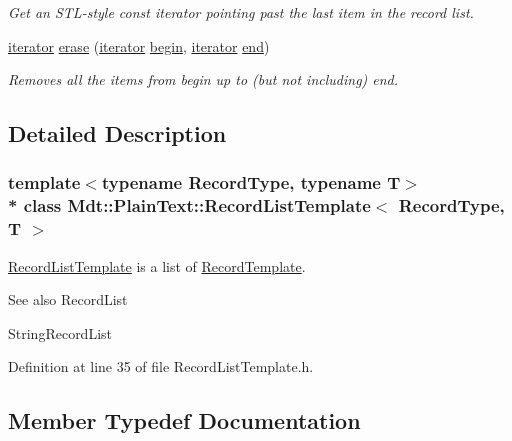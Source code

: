 \begin{DoxyCompactItemize}
\begin{DoxyCompactList}\small\item\em Get an S\+T\+L-\/style const iterator pointing past the last item in the record list. \end{DoxyCompactList}\item 
\hyperlink{class_mdt_1_1_plain_text_1_1_record_list_template_a5b0caae56b05a38e53539cad1da8cd12}{iterator} \hyperlink{class_mdt_1_1_plain_text_1_1_record_list_template_a0266fea4751369b369d81933043b87a9}{erase} (\hyperlink{class_mdt_1_1_plain_text_1_1_record_list_template_a5b0caae56b05a38e53539cad1da8cd12}{iterator} \hyperlink{class_mdt_1_1_plain_text_1_1_record_list_template_af4f42b3785c7ddbbafd9bf3c15ead7d4}{begin}, \hyperlink{class_mdt_1_1_plain_text_1_1_record_list_template_a5b0caae56b05a38e53539cad1da8cd12}{iterator} \hyperlink{class_mdt_1_1_plain_text_1_1_record_list_template_accf34cd248a894d4af04510312bbdf23}{end})
\begin{DoxyCompactList}\small\item\em Removes all the items from begin up to (but not including) end. \end{DoxyCompactList}\end{DoxyCompactItemize}


\subsection{Detailed Description}
\subsubsection*{template$<$typename Record\+Type, typename T$>$\\*
class Mdt\+::\+Plain\+Text\+::\+Record\+List\+Template$<$ Record\+Type, T $>$}

\hyperlink{class_mdt_1_1_plain_text_1_1_record_list_template}{Record\+List\+Template} is a list of \hyperlink{class_mdt_1_1_plain_text_1_1_record_template}{Record\+Template}. 

\begin{DoxySeeAlso}{See also}
Record\+List 

String\+Record\+List 
\end{DoxySeeAlso}


Definition at line 35 of file Record\+List\+Template.\+h.



\subsection{Member Typedef Documentation}
